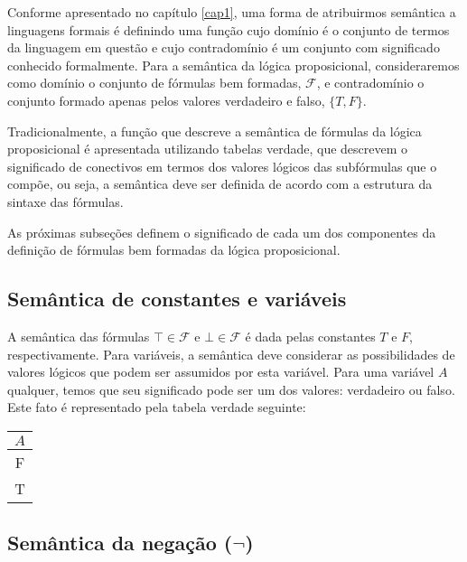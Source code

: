 Conforme apresentado no cap\'itulo \ref{cap1}, uma forma de
atribuirmos sem\^antica a linguagens formais \'e definindo uma
fun\c{c}\~ao cujo dom\'inio \'e o conjunto de termos da linguagem
em quest\~ao e cujo contradom\'inio \'e um conjunto com
significado conhecido formalmente. Para a sem\^antica da l\'ogica
proposicional, consideraremos como dom\'inio o conjunto de f\'ormulas
bem formadas, $\mathcal{F}$, e contradom\'inio o conjunto formado
apenas pelos valores verdadeiro e falso, $\{T,F\}$. 

Tradicionalmente, a fun\c{c}\~ao que descreve a sem\^antica de
f\'ormulas da l\'ogica proposicional \'e apresentada utilizando 
tabelas verdade, que descrevem o significado de conectivos em termos
dos valores l\'ogicos das subf\'ormulas que o comp\~oe, ou seja,
a sem\^antica deve ser definida de acordo com a estrutura da sintaxe
das f\'ormulas. 

As pr\'oximas subse\c{c}\~oes definem o significado de
cada um dos componentes da defini\c{c}\~ao de f\'ormulas bem formadas
da l\'ogica proposicional.


\subsection{Sem\^antica de constantes e vari\'aveis}

A sem\^antica das f\'ormulas $\top\in\mathcal{F}$ e
$\bot\in\mathcal{F}$ \'e dada pelas constantes $T$ e $F$,
respectivamente. Para vari\'aveis, a sem\^antica deve considerar as
possibilidades de valores l\'ogicos que podem ser assumidos por esta
vari\'avel. Para uma vari\'avel $A$ qualquer, temos que seu
significado pode ser um dos valores: verdadeiro ou falso. Este fato
\'e representado pela tabela verdade seguinte:
\begin{table}[h]
  \begin{tabular}{|c|}
        \hline
        $A$\\
        \hline
         F \\
         \hline
         T \\ \hline
  \end{tabular}
  \centering
\end{table}


\subsection{Sem\^antica da nega\c{c}\~ao ($\neg$)}

